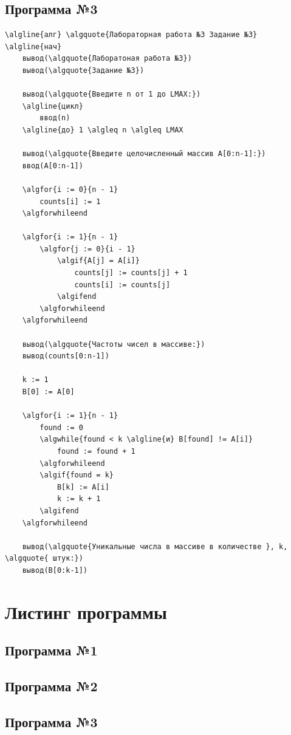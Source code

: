 \subsection{Программа №3}
\begin{Verbatim}[commandchars=\\\{\}]
\algline{алг} \algquote{Лабораторная работа №3 Задание №3}
\algline{нач}
    вывод(\algquote{Лаборатоная работа №3})
    вывод(\algquote{Задание №3})

    вывод(\algquote{Введите n от 1 до LMAX:})
    \algline{цикл}
        ввод(n)
    \algline{до} 1 \algleq n \algleq LMAX

    вывод(\algquote{Введите целочисленный массив A[0:n-1]:})
    ввод(A[0:n-1])

    \algfor{i := 0}{n - 1}
        counts[i] := 1
    \algforwhileend

    \algfor{i := 1}{n - 1}
        \algfor{j := 0}{i - 1}
            \algif{A[j] = A[i]}
                counts[j] := counts[j] + 1
                counts[i] := counts[j]
            \algifend
        \algforwhileend
    \algforwhileend

    вывод(\algquote{Частоты чисел в массиве:})
    вывод(counts[0:n-1])

    k := 1
    B[0] := A[0]

    \algfor{i := 1}{n - 1}
        found := 0
        \algwhile{found < k \algline{и} B[found] != A[i]}
            found := found + 1
        \algforwhileend
        \algif{found = k}
            B[k] := A[i]
            k := k + 1
        \algifend
    \algforwhileend

    вывод(\algquote{Уникальные числа в массиве в количестве }, k, \algquote{ штук:})
    вывод(B[0:k-1])
\end{Verbatim}

\newpage
\section{Листинг программы}


\subsection{Программа №1}

\subsection{Программа №2}

\subsection{Программа №3}


